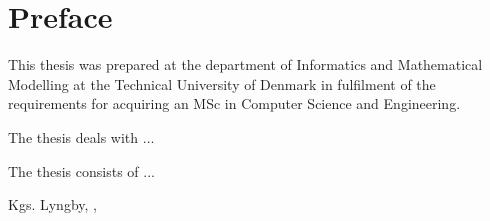 
\chapter{Preface}

This thesis was prepared at the department of Informatics and Mathematical Modelling at the Technical University of Denmark in fulfilment of the
requirements for acquiring an MSc in Computer Science and Engineering. 

The thesis deals with ... 

The thesis consists of ...
\vspace{20mm}
\begin{center}
	\hspace{20mm} Kgs. Lyngby, \thesishandin, \thesisyear 
	\vspace{5mm}
	\newline
 

\end{center}
\begin{flushright}
	\vspace{6em}
	\thesisauthor
\end{flushright}
